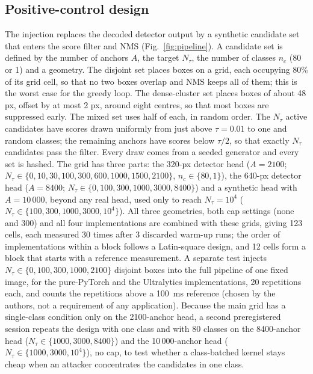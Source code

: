 \documentclass[a4paper,fleqn]{cas-dc}
\newcommand{\Ntau}{N_{\tau}}
\begin{document}
\subsection{Positive-control design}
The injection replaces the decoded detector output by a synthetic candidate set that enters the score filter and NMS (Fig.~\ref{fig:pipeline}). A candidate set is defined by the number of anchors $A$, the target $\Ntau$, the number of classes $n_c$ (80 or 1) and a geometry. The disjoint set places boxes on a grid, each occupying 80\% of its grid cell, so that no two boxes overlap and NMS keeps all of them; this is the worst case for the greedy loop. The dense-cluster set places boxes of about 48 px, offset by at most 2 px, around eight centres, so that most boxes are suppressed early. The mixed set uses half of each, in random order. The $\Ntau$ active candidates have scores drawn uniformly from just above $\tau=0.01$ to one and random classes; the remaining anchors have scores below $\tau/2$, so that exactly $\Ntau$ candidates pass the filter. Every draw comes from a seeded generator and every set is hashed. The grid has three parts: the 320-px detector head ($A=2100$; $\Ntau\in\{0,10,30,100,300,600,1000,1500,2100\}$, $n_c\in\{80,1\}$), the 640-px detector head ($A=8400$; $\Ntau\in\{0,100,300,1000,3000,8400\}$) and a synthetic head with $A=10\,000$, beyond any real head, used only to reach $\Ntau=10^4$ ($\Ntau\in\{100,300,1000,3000,10^4\}$). All three geometries, both cap settings (none and 300) and all four implementations are combined with these grids, giving 123 cells, each measured 30 times after 3 discarded warm-up runs; the order of implementations within a block follows a Latin-square design, and 12 cells form a block that starts with a reference measurement. A separate test injects $\Ntau\in\{0,100,300,1000,2100\}$ disjoint boxes into the full pipeline of one fixed image, for the pure-PyTorch and the Ultralytics implementations, 20 repetitions each, and counts the repetitions above a 100~ms reference (chosen by the authors, not a requirement of any application). Because the main grid has a single-class condition only on the 2100-anchor head, a second preregistered session repeats the design with one class and with 80 classes on the 8400-anchor head ($\Ntau\in\{1000,3000,8400\}$) and the 10\,000-anchor head ($\Ntau\in\{1000,3000,10^4\}$), no cap, to test whether a class-batched kernel stays cheap when an attacker concentrates the candidates in one class.
\end{document}
